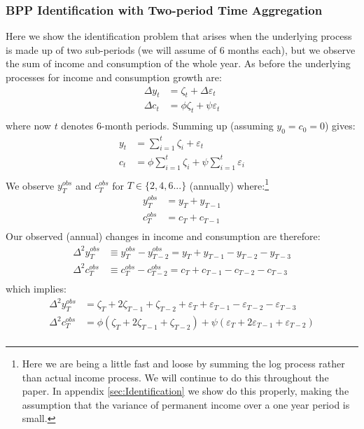 \documentclass[titlepage]{\econtex}\newcommand{\texname}{IncomeUncertainty}
\begin{document}
\subsubsection{BPP Identification with Two-period Time Aggregation} \label{BPP_two_period}
Here we show the identification problem that arises when the underlying process is made up of two sub-periods (we will assume of 6 months each), but we observe the sum of income and consumption of the whole year. As before the underlying processes for income and consumption growth are:
\begin{align*}
\Delta y_t & = \zeta_t + \Delta \varepsilon_t \\
\Delta c_t & = \phi \zeta_t + \psi \varepsilon_t  \\
\end{align*}
where now $t$ denotes 6-month periods. Summing up (assuming $y_0=c_0=0$) gives:
\begin{align*}
y_t & = \sum_{i=1}^t \zeta_i + \varepsilon_t  \\
c_t & = \phi \sum_{i=1}^t \zeta_i + \psi \sum_{i=1}^t \varepsilon_i  \\
\end{align*}
We observe $y^{obs}_T$ and $c^{obs}_T$ for $T \in \{2,4,6...\}$ (annually) where:\footnote{Here we are being a little fast and loose by summing the log process rather than actual income process. We will continue to do this throughout the paper. In appendix \ref{sec:Identification} we show do this properly, making the assumption that the variance of permanent income over a one year period is small.}
\begin{align*}
y^{obs}_T & = y_T + y_{T-1}  \\
c^{obs}_T & = c_T + c_{T-1}  \\
\end{align*}
Our observed (annual) changes in income and consumption are therefore:
\begin{align*}
\Delta^2 y^{obs}_T & \equiv y^{obs}_T-y^{obs}_{T-2} =  y_T + y_{T-1} - y_{T-2} - y_{T-3} \\
\Delta^2 c^{obs}_T & \equiv c^{obs}_T-c^{obs}_{T-2} =  c_T + c_{T-1} - c_{T-2} - c_{T-3}  \\
\end{align*}
which implies:
\begin{align*}
\Delta^2 y^{obs}_T & = \zeta_T + 2\zeta_{T-1} +\zeta_{T-2} + \varepsilon_T + \varepsilon_{T-1} - \varepsilon_{T-2} - \varepsilon_{T-3} \\
\Delta^2 c^{obs}_T & =  \phi(\zeta_T + 2\zeta_{T-1} +\zeta_{T-2}) + \psi(\varepsilon_T + 2\varepsilon_{T-1} + \varepsilon_{T-2} ) \\
\end{align*}
\end{document}
